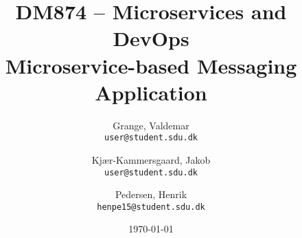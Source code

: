 \documentclass[12pt]{article}
\title{DM874 -- Microservices and DevOps \\ {\large Microservice-based Messaging Application}}
\date{\longdate\today}
\author{
  Grange, Valdemar \\ \texttt{user@student.sdu.dk}
  \and 
  Kjær-Kammersgaard, Jakob \\ \texttt{user@student.sdu.dk}
  \and 
  Pedersen, Henrik \\ \texttt{henpe15@student.sdu.dk}
}
\begin{document}
\begin{titlepage}
    \begin{center}
        \vspace*{-2cm}\hspace*{1cm}
 
        \vspace{2.5cm}


        {\let\newpage\relax\maketitle}
        \thispagestyle{empty}

        \vspace{0.8cm}

        \begin{minipage}{.8\textwidth}
        
        \end{minipage}

    \end{center}
\end{titlepage}


\newpage

\setcounter{tocdepth}{2}
\tableofcontents
\newpage













\clearpage

\newpage

\end{document}
